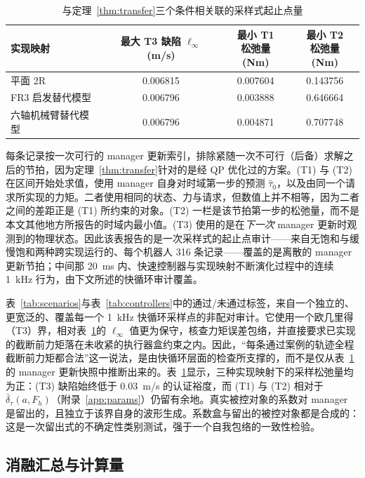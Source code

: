 \documentclass[journal]{IEEEtran}
\begin{document}
\begin{table}[t]
\caption{与定理~\ref{thm:transfer}三个条件相关联的采样式起止点量}
\label{tab:audit}
\centering
\footnotesize
\setlength{\tabcolsep}{3pt}
\begin{tabular}{@{}lccc@{}}
\toprule
实现映射 & \shortstack{最大 T3 缺陷\\$\ell_\infty$ (m/s)} & \shortstack{最小 T1\\松弛量 (Nm)} & \shortstack{最小 T2\\松弛量 (Nm)} \\
\midrule
平面 2R & 0.006815 & 0.007604 & 0.143756 \\
FR3 启发替代模型 & 0.006796 & 0.003888 & 0.646664 \\
六轴机械臂替代模型 & 0.006796 & 0.004871 & 0.707748 \\
\bottomrule
\end{tabular}
\end{table}

每条记录按一次可行的 manager 更新索引，排除紧随一次不可行（后备）求解之后的节拍，因为定理~\ref{thm:transfer}针对的是经 QP 优化过的方案。(T1) 与 (T2) 在区间开始处求值，使用 manager 自身对时域第一步的预测 $\hat\tau_0$，以及由同一个请求所实现的力矩。二者使用相同的状态、力与请求，但数值上并不相等，因为二者之间的差距正是 (T1) 所约束的对象。(T2) 一栏是该节拍第一步的松弛量，而不是本文其他地方所报告的时域内最小值。(T3) 使用的是在\emph{下一次} manager 更新时观测到的物理状态。因此该表报告的是一次采样式的起止点审计——来自无饱和与缓慢饱和两种跨实现运行的、每个机器人 316 条记录——覆盖的是离散的 manager 更新节拍；中间那 20~ms 内、快速控制器与实现映射不断演化过程中的连续 1~kHz 行为，由下文所述的快循环审计覆盖。

表~\ref{tab:scenarios}与表~\ref{tab:controllers}中的通过/未通过标签，来自一个独立的、更宽泛的、覆盖每一个 1~kHz 快循环采样点的非配对审计。它使用一个欧几里得（T3）界，相对表~\ref{tab:audit}的 $\ell_\infty$ 值更为保守，核查力矩误差包络，并直接要求已实现的截断前力矩落在未收紧的执行器盒约束之内。因此，“每条通过案例的轨迹全程截断前力矩都合法”这一说法，是由快循环层面的检查所支撑的，而不是仅从表~\ref{tab:audit}的 manager 更新快照中推断出来的。表~\ref{tab:audit}显示，三种实现映射下的采样松弛量均为正：(T3) 缺陷始终低于 0.03~m/s 的认证裕度，而 (T1) 与 (T2) 相对于 $\bar\delta_\tau(a,F_h)$（附录~\ref{app:params}）仍留有余地。真实被控对象的系数对 manager 是留出的，且独立于该界自身的波形生成。系数盒与留出的被控对象都是合成的：这是一次留出式的不确定性类别测试，强于一个自我包络的一致性检验。

\subsection{消融汇总与计算量}
\label{sec:ablation}
\end{document}
